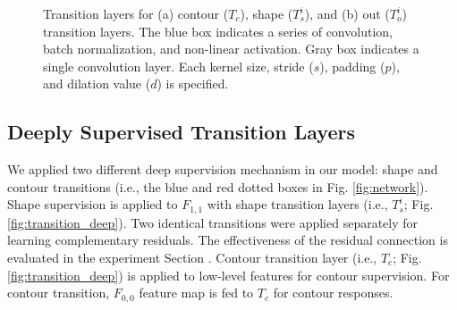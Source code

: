 \documentclass[journal]{IEEEtran}
\begin{document}
\begin{figure}[t]
    \centering
    \vfil
    \caption{Transition layers for (a) contour (\(T_c\)), shape (\(T^i_s\)), and (b) out (\(T^i_o\)) transition layers. The blue box indicates a series of convolution, batch normalization, and non-linear activation. Gray box indicates a single convolution layer. Each kernel size, stride ($s$), padding ($p$), and dilation value ($d$) is specified.}
    \label{fig:transition}
\end{figure}

\subsection{Deeply Supervised Transition Layers}
We applied two different deep supervision mechanism in our model: shape and contour transitions (i.e., the blue and red dotted boxes in Fig. \ref{fig:network}). Shape supervision is applied to \(F_{1,1}\) with shape transition layers (i.e., \(T^i_s\); Fig. \ref{fig:transition_deep}). Two identical transitions were applied separately for learning complementary residuals. The effectiveness of the residual connection is evaluated in the experiment Section . Contour transition layer (i.e., \(T_c\); Fig. \ref{fig:transition_deep}) is applied to low-level features for contour supervision. For contour transition, \(F_{0,0}\) feature map is fed to \(T_c\) for contour responses.\par
\end{document}
